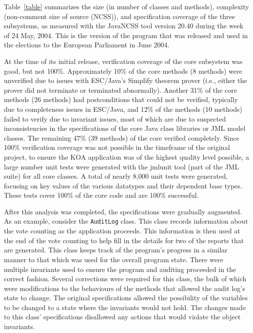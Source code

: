 \documentclass[times, 10pt, twocolumn]{article}
\begin{document}
Table~\ref{table} summarizes the size (in number of classes and methods), 
complexity (non-comment size of source (NCSS)), and specification coverage of 
the three subsystems, as measured with the JavaNCSS tool version 20.40 during 
the week of 24 May, 2004. This is the version of the program that was released 
and used in the elections to the European Parliament in June 2004.

At the time of its initial release, verification coverage of the core subsystem 
was good, but not 100\%. Approximately 10\% of the core methods (8 methods) 
were unverified due to issues with ESC/Java's Simplify theorem prover (i.e., 
either the prover did not terminate or terminated abnormally). Another 31\% of 
the core methods (26 methods) had postconditions that could not be verified, 
typically due to completeness issues in ESC/Java, and 12\% of the methods (10 
methods) failed to verify due to invariant issues, most of which are due to 
suspected inconsistencies in the specifications of the core Java class 
libraries or JML model classes. The remaining 47\% (39 methods) of the core 
verified completely. Since 100\% verification coverage was not possible in the 
timeframe of the original project, to ensure the KOA application was of the 
highest quality level possible, a large number unit tests were generated with 
the jmlunit tool (part of the JML suite) for all core classes. A total of 
nearly 8,000 unit tests were generated, focusing on key values of the various 
datatypes and their dependent base types. These tests cover 100\% of the core 
code and are 100\% successful.

After this analysis was completed, the specifications were 
gradually augmented. As an example, consider the \texttt{AuditLog} class. This 
class records information about the vote counting as the application proceeds. 
This information is then used at the end of the vote counting to help fill in 
the details for two of the reports that are generated. This class keeps track 
of the program's progress in a similar manner to that which was used for the 
overall program state. There were multiple invariants used to ensure the 
program and auditing proceeded in the correct fashion. Several corrections were 
required for this class, the bulk of which were modifications to the behaviours 
of the methods that allowed the audit log's state to change. The original 
specifications allowed the possibility of the variables to be changed to a 
state where the invariants would not hold. The changes made to this class' 
specifications disallowed any actions that would violate the object invariants.
\end{document}
